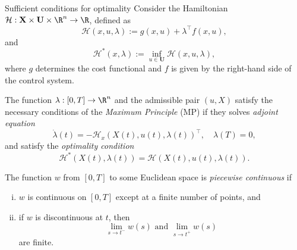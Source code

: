 \begin{frame}{Sufficient conditions for optimality}
    Consider the Hamiltonian 
    $
        \mathcal{H}:\mathbf{X}\times\mathbf{U}\times\R^n\to \R
    $, defined as 
    \[
        \mathcal{H}(x, u, \lambda):=
             g(x,u) + \lambda ^ \top f(x,u),
    \]
        and
        \[ 
            \mathcal{H}^\ast(x,\lambda)  
            := \inf_{u\in\mathbf{U}}\mathcal{H}(x,u,\lambda),
        \]
        where $g$ determines the cost functional 
        and $f$ is given by the right-hand side of the control system.

        The function $\lambda:[0,T]\to \R^n$ and the admissible pair 
        $(u,X)$ satisfy the necessary conditions of the 
        {\it Maximum Principle} (MP) if they solves
        {\it adjoint equation}
        \begin{equation*}
             \dot{\lambda}(t) = -\mathcal{H}_x(X(t),u(t),\lambda(t))^\top, 
             \quad \lambda(T)=0,
        \end{equation*}
        and satisfy the {\it optimality condition}
        \begin{equation*}\label{OptCond}
            \mathcal{H}^\ast(X(t),\lambda(t)) =
            \mathcal{H}(X(t),u(t),\lambda(t)).
       \end{equation*}
\end{frame}

\begin{frame}{}
    \begin{definition}\label{PiecewiseCont}
        \rm The function $w$ from $[0,T]$ to some Euclidean space is {\it 
        piecewise continuous} if
        \begin{enumerate}[(i)]
            \item $w$ is continuous on $[0,T]$ except at a finite number of 
            points, and 
            \item if $w$ is discontinuous at $t$, then  
                \[\lim_{s\to t^-}w(s) \mbox{ and } \lim_{s\to t^+}w(s)\]
                are finite. 
        \end{enumerate}
    \end{definition}
\end{frame}

